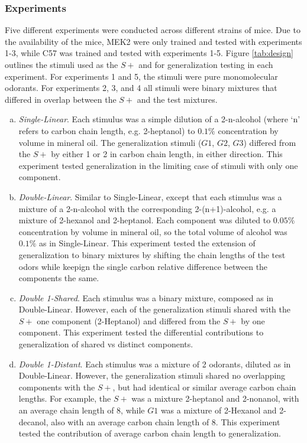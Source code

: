 \subsubsection*{Experiments}
\label{sec:methods_experiment_types}
Five different experiments were conducted across different strains of mice. 
Due to the availability of the mice, MEK2 were only trained and tested with experiments 1-3, while C57 was trained and tested with experiments 1-5.  
Figure \ref{tab:design} outlines the stimuli used as the $S+$ and for generalization testing in each experiment. 
For experiments 1 and 5, the stimuli were pure monomolecular odorants. 
For experiments 2, 3, and 4 all stimuli were binary mixtures that differed in overlap between the $S+$ and the test mixtures. 

\begin{enumerate}[(a)]
\item \textit{Single-Linear}. Each stimulus was a simple dilution of a 2-n-alcohol (where `n' refers to carbon chain length, e.g. 2-heptanol) to $0.1\%$ concentration by volume in mineral oil.
The generalization stimuli ($G1$, $G2$, $G3$) differed from the $S+$ by either 1 or 2 in carbon chain length, in either direction.  
This experiment tested generalization in the limiting case of stimuli with only one component.   

\item \textit{Double-Linear}. Similar to Single-Linear, except that each stimulus was a mixture of a 2-n-alcohol with the corresponding 2-(n+1)-alcohol, e.g. a mixture of 2-hexanol and 2-heptanol.  
Each component was diluted to $0.05\%$ concentration by volume in mineral oil, so the total volume of alcohol was $0.1\%$ as in Single-Linear.  
This experiment tested the extension of generalization to binary mixtures by shifting the chain lengths of the test odors while keepign the single carbon relative difference between the components the same.  

\item \textit{Double 1-Shared}. Each stimulus was a binary mixture, composed as in Double-Linear. 
However, each of the generalization stimuli shared with the $S+$ one component (2-Heptanol) and differed from the $S+$ by one component.  
This experiment tested the differential contributions to generalization of shared vs distinct components.  

\item \textit{Double 1-Distant}. Each stimulus was a mixture of 2 odorants, diluted as in Double-Linear. However, the generalization stimuli shared no overlapping components with the $S+$, but had identical or similar average carbon chain lengths. 
For example, the $S+$ was a mixture 2-heptanol and 2-nonanol, with an average chain length of 8, while $G1$ was a mixture of 2-Hexanol and 2-decanol, also with an average carbon chain length of 8.  This experiment tested the contribution of average carbon chain length to generalization.  


\end{enumerate}
